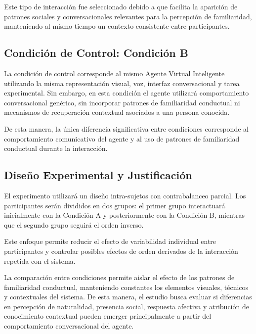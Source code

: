 \documentclass[12pt]{article}
\begin{document}
Este tipo de interacción fue seleccionado debido a que facilita la aparición de patrones sociales y conversacionales relevantes para la percepción de familiaridad, manteniendo al mismo tiempo un contexto consistente entre participantes.

\subsection{Condición de Control: Condición B}

La condición de control corresponde al mismo Agente Virtual Inteligente utilizando la misma representación visual, voz, interfaz conversacional y tarea experimental. Sin embargo, en esta condición el agente utilizará comportamiento conversacional genérico, sin incorporar patrones de familiaridad conductual ni mecanismos de recuperación contextual asociados a una persona conocida.

De esta manera, la única diferencia significativa entre condiciones corresponde al comportamiento comunicativo del agente y al uso de patrones de familiaridad conductual durante la interacción.

\subsection{Diseño Experimental y Justificación}

El experimento utilizará un diseño intra-sujetos con contrabalanceo parcial. Los participantes serán divididos en dos grupos: el primer grupo interactuará inicialmente con la Condición A y posteriormente con la Condición B, mientras que el segundo grupo seguirá el orden inverso.

Este enfoque permite reducir el efecto de variabilidad individual entre participantes y controlar posibles efectos de orden derivados de la interacción repetida con el sistema.

La comparación entre condiciones permite aislar el efecto de los patrones de familiaridad conductual, manteniendo constantes los elementos visuales, técnicos y contextuales del sistema. De esta manera, el estudio busca evaluar si diferencias en percepción de naturalidad, presencia social, respuesta afectiva y atribución de conocimiento contextual pueden emerger principalmente a partir del comportamiento conversacional del agente.
\end{document}
